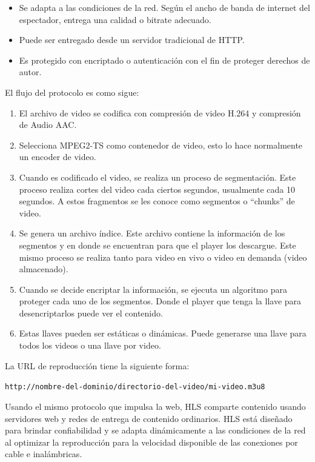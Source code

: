 \begin{itemize}
    \item Se adapta a las condiciones de la red. Según el ancho de banda de internet del espectador, entrega una calidad o bitrate adecuado.
    \item Puede ser entregado desde un servidor tradicional de HTTP.
    \item Es protegido con encriptado o autenticación con el fin de proteger derechos de autor.
\end{itemize}

El flujo del protocolo es como sigue: 
\begin{enumerate}
    \item El archivo de video se codifica con compresión de video H.264 y compresión de Audio AAC.
    \item Selecciona MPEG2-TS como contenedor de video, esto lo hace normalmente un encoder de video.
    \item Cuando es codificado el video, se realiza un proceso de segmentación.  Este proceso realiza cortes del video cada ciertos segundos, usualmente cada 10 segundos. A estos fragmentos se les conoce como segmentos o ``chunks'' de video.
    \item Se genera un archivo índice. Este archivo contiene la información de los segmentos y en donde se encuentran para que el player los descargue. Este mismo proceso se realiza tanto para video en vivo o video en demanda (video almacenado).
    \item Cuando se decide encriptar la información, se ejecuta un algoritmo para proteger cada uno de los segmentos. Donde el player que tenga la llave para desencriptarlos puede ver el contenido.
    \item  Estas llaves pueden ser estáticas o dinámicas. Puede generarse una llave para todos los videos o una llave por video.
\end{enumerate}
La URL de reproducción tiene la siguiente forma:
\begin{center}
    \verb|http://nombre-del-dominio/directorio-del-video/mi-video.m3u8|    
\end{center}

Usando el mismo protocolo que impulsa la web, HLS comparte contenido usando servidores web y redes de entrega de contenido ordinarios. HLS está diseñado para brindar confiabilidad y se adapta dinámicamente a las condiciones de la red al optimizar la reproducción para la velocidad disponible de las conexiones por cable e inalámbricas.\\

